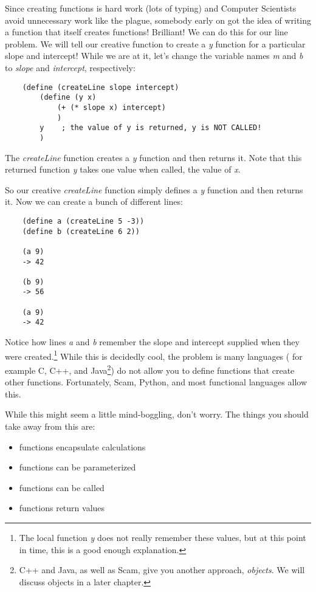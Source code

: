Since creating functions is hard work (lots of typing) and
Computer Scientists avoid unnecessary work like the plague, somebody
early on got the idea of writing a function that itself 
creates functions! Brilliant! We can do this for our line problem.
We will tell our creative function to create a {\it y} function
for a particular slope and intercept! While we are at it,
let's change the variable names {\it m} and {\it b} to {\it slope}
and {\it intercept}, respectively:

\begin{verbatim}
    (define (createLine slope intercept)
        (define (y x)
            (+ (* slope x) intercept)
            )
        y    ; the value of y is returned, y is NOT CALLED!
        )
\end{verbatim}

The {\it createLine} function creates a {\it y} function
and then returns it. Note that this returned function {\it y} takes
one value when called, the value of {\it x}.

So our creative {\it createLine} function
simply defines a {\it y} function and then
returns it. Now we can create a bunch of different lines:

\begin{verbatim}
    (define a (createLine 5 -3))
    (define b (createLine 6 2))

    (a 9)
    -> 42
    
    (b 9)
    -> 56

    (a 9)
    -> 42
\end{verbatim}

Notice how lines {\it a} and {\it b} remember
the slope and intercept supplied
when they were created.\footnote{
The local function {\it y} does not really remember these values,
but at this point in time, this is a good enough explanation.}
While this is decidedly cool, the problem is many languages (
for example C, C++, and Java\footnote{
C++ and Java, as well as Scam, give you another approach, {\it objects}.
We will discuss objects in a later chapter.})
do not allow you to define functions that create other functions.
Fortunately, Scam, Python, and most functional languages allow this.

While this might seem a little mind-boggling, don't worry. The
things you should take away from this are:

\begin{itemize}
\item
    functions encapsulate calculations
\item
    functions can be parameterized
\item
    functions can be called
\item
    functions return values
\end{itemize}
